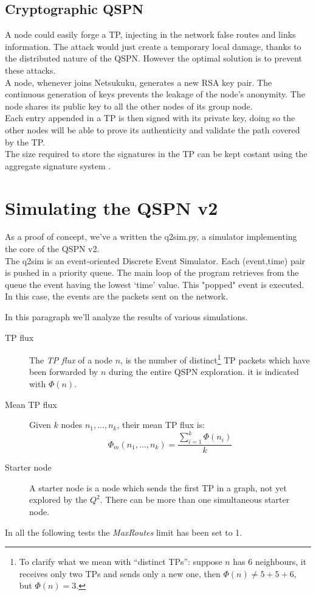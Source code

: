 \documentclass[a4paper]{article}
\begin{document}
\subsection{Cryptographic QSPN}
A node could easily forge a TP, injecting in the network false routes and
links information. The attack would just create a temporary local damage,
thanks to the distributed nature of the QSPN. However the optimal solution is
to prevent these attacks.\\

A node, whenever joins Netsukuku, generates a new RSA key pair. The
continuous generation of keys prevents the leakage of the node's anonymity.
The node shares its public key to all the other nodes of its group node.\\
Each entry appended in a TP is then signed with its private key, doing so the
other nodes will be able to prove its authenticity and validate the path
covered by the TP.\\
The size required to store the signatures in the TP can be kept costant using the
aggregate signature system \cite{aggrsign1} \cite{aggrsign2}.

\section{Simulating the QSPN v2}
As a proof of concept, we've a written the q2sim.py\cite{q2sim}, a simulator
implementing the core of the QSPN v2.\\
The q2sim is  an event-oriented Discrete Event Simulator.
Each (event,time) pair is pushed in a priority queue.
The main loop of the program retrieves from the queue the event having the
lowest `time' value. This "popped" event is executed. In this case, the
events are the packets sent on the network.

In this paragraph we'll analyze the results of various simulations.
\begin{description}
	\item[TP flux] The \emph{TP flux} of a node $n$, is the number of
		distinct\footnote{To clarify what we mean with ``distinct
		TPs'': suppose $n$ has $6$ neighbours, it receives only two
		TPs and sends only a new one, then $\Phi(n)\neq 5+5+6$, but
		$\Phi(n)=3$.}
		TP packets which have been forwarded by $n$ during the entire QSPN
		exploration. it is indicated with $\Phi(n)$.
	\item[Mean TP flux] Given $k$ nodes ${n_1,\dots,n_k}$, their mean TP
		flux is:
		\[
		\Phi_m({n_1,\dots,n_k})=\frac{\sum_{i=1}^{k}\Phi(n_i)}{k}
		\]
	\item[Starter node]
		A starter node is a node which sends the first TP in a graph,
		not yet explored by the $Q^2$. There can be more than one
		simultaneous starter node.
\end{description}
In all the following tests the \emph{MaxRoutes} limit has been set to 1.\\
\end{document}

